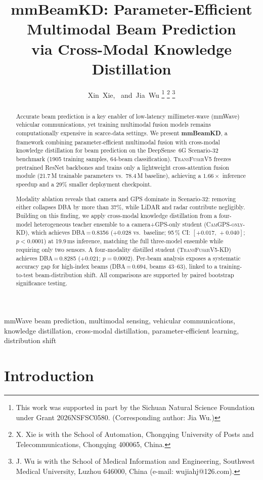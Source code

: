 \documentclass[journal,10pt,twoside]{IEEEtran}
\title{mmBeamKD: Parameter-Efficient Multimodal Beam Prediction\\
via Cross-Modal Knowledge Distillation}
\author{Xin~Xie,~\IEEEmembership{Member,~IEEE}
        and~Jia~Wu%
\thanks{This work was supported in part by the Sichuan Natural Science Foundation under Grant 2026NSFSC0580. (Corresponding author: Jia Wu.)}%
\thanks{X. Xie is with the School of Automation, Chongqing University of Posts and Telecommunications, Chongqing 400065, China.}%
\thanks{J. Wu is with the School of Medical Information and Engineering, Southwest Medical University, Luzhou 646000, China (e-mail: wujiahj@126.com).}%
}
\newcommand{\ours}{\textsc{TransFuserV5}}
\newcommand{\distill}{\textsc{TransFuserV5-KD}}
\begin{document}
\maketitle

\begin{abstract}
Accurate beam prediction is a key enabler of low-latency millimeter-wave (mmWave)
vehicular communications, yet training multimodal fusion models remains
computationally expensive in scarce-data settings. We present \textbf{mmBeamKD},
a framework combining parameter-efficient multimodal fusion with cross-modal
knowledge distillation for beam prediction on the DeepSense~6G Scenario-32
benchmark (1905 training samples, 64-beam classification).
\ours{} freezes pretrained ResNet backbones and trains only a lightweight
cross-attention fusion module (21.7\,M trainable parameters vs.\ 78.4\,M
baseline), achieving a $1.66\times$ inference speedup and a 29\% smaller
deployment checkpoint.

Modality ablation reveals that camera and GPS dominate in Scenario-32:
removing either collapses DBA by more than 37\%, while LiDAR and radar
contribute negligibly. Building on this finding, we apply cross-modal
knowledge distillation from a four-model heterogeneous teacher ensemble
to a camera+GPS-only student (\textsc{CamGPS-only-KD}), which achieves
DBA\,=\,0.8356 ($+0.028$ vs.\ baseline; 95\,\% CI: $[+0.017,\,+0.040]$;
$p < 0.0001$) at 19.9\,ms inference, matching the full three-model ensemble
while requiring only two sensors. A four-modality distilled student (\distill{})
achieves DBA\,=\,0.8285 ($+0.021$; $p=0.0002$). Per-beam analysis exposes a
systematic accuracy gap for high-index beams (DBA\,=\,0.694, beams 43--63),
linked to a training-to-test beam-distribution shift.
All comparisons are supported by paired bootstrap significance testing.
\end{abstract}

\begin{IEEEkeywords}
mmWave beam prediction, multimodal sensing, vehicular communications,
knowledge distillation, cross-modal distillation, parameter-efficient learning,
distribution shift
\end{IEEEkeywords}

\section{Introduction}
\label{sec:intro}
\end{document}
